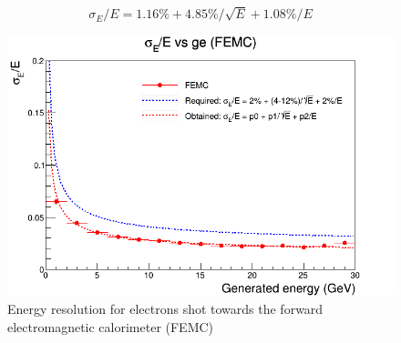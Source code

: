 $$\sigma _E/E = 1.16\% + 4.85\%/\sqrt{E} + 1.08\%/E $$

\begin{figure}
        \centering  
		\includegraphics[width=0.5\linewidth]{group1/Resolution_FEMC.png}
		\caption{Energy resolution for electrons shot towards the forward electromagnetic calorimeter (FEMC)}
		\label{fig:g1_ch5_img3}
\end{figure}

